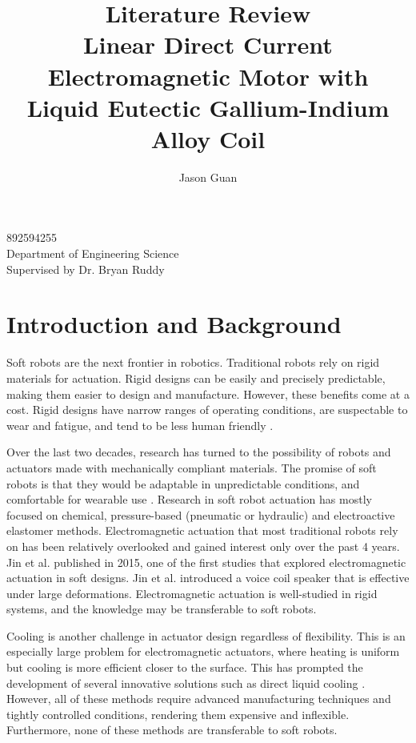 \documentclass[a4paper,12pt]{article}
\title{Literature Review \\
	\large Linear Direct Current Electromagnetic Motor with\\
	Liquid Eutectic Gallium-Indium Alloy Coil}
\author{Jason Guan}
\begin{document}
\maketitle
\begin{center}
    892594255\\
    Department of Engineering Science\\
    Supervised by Dr. Bryan Ruddy
\end{center}
\thispagestyle{empty}

\newpage

\section{Introduction and Background}

Soft robots are the next frontier in robotics. Traditional robots rely on rigid materials for actuation. Rigid designs can be easily and precisely predictable, making them easier to design and manufacture. However, these benefits come at a cost. Rigid designs have narrow ranges of operating conditions, are suspectable to wear and fatigue, and tend to be less human friendly \cite{rusDesignFabricationControl2015}.

Over the last two decades, research has turned to the possibility of robots and actuators made with mechanically compliant materials. The promise of soft robots is that they would be adaptable in unpredictable conditions, and comfortable for wearable use \cite{leeSoftRobotReview2017}. Research in soft robot actuation has mostly focused on chemical\cite{onalSoftMobileRobots2017}, pressure-based (pneumatic or hydraulic)\cite{suzumoriBendingPneumaticRubber2007} and electroactive elastomer\cite{andersonMultifunctionalDielectricElastomer2012} methods. Electromagnetic actuation that most traditional robots rely on has been relatively overlooked and gained interest only over the past 4 years. Jin et al. published \cite{jinStretchableLoudspeakerUsing2015} in 2015, one of the first studies that explored electromagnetic actuation in soft designs. Jin et al. introduced a voice coil speaker that is effective under large deformations. Electromagnetic actuation is well-studied in rigid systems, and the knowledge may be transferable to soft robots.

Cooling is another challenge in actuator design regardless of flexibility. This is an especially large problem for electromagnetic actuators, where heating is uniform but cooling is more efficient closer to the surface. This has prompted the development of several innovative solutions such as direct liquid cooling \cite{henkeChallengesOpportunitiesVery2018}. However, all of these methods require advanced manufacturing techniques and tightly controlled conditions, rendering them expensive and inflexible. Furthermore, none of these methods are transferable to soft robots.
\end{document}
